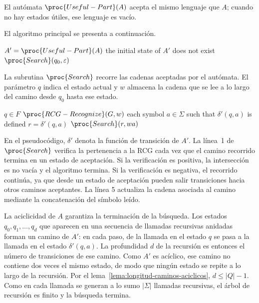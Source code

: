 \documentclass{report}
\theoremstyle{definition}
\theoremstyle{plain}
\theoremstyle{remark}
\begin{document}
El autómata $\proc{Useful-Part}(A)$ acepta el mismo lenguaje que $A$;
cuando no hay estados útiles, ese lenguaje es vacío.

El algoritmo principal se presenta a continuación.

\begin{codebox}
\li $A' = \proc{Useful-Part}(A)$
\li \If the initial state of $A'$ does not exist
\li \Then \Return {}
    \End
\li \Return $\proc{Search}(q_0,\varepsilon)$
\end{codebox}

La subrutina $\proc{Search}$ recorre las cadenas aceptadas por el
autómata. El parámetro $q$ indica el estado actual y $w$ almacena la
cadena que se lee a lo largo del camino desde $q_0$ hasta ese estado.

\begin{codebox}
\li \If $q \in F$  $\proc{RCG-Recognize}(G,w)$
\li \Then \Return {}
    \End
\li \For each symbol $a \in \Sigma$ such that $\delta'(q,a)$ is defined
\li \Do
        $r = \delta'(q,a)$
\li     \If $\proc{Search}(r,wa)$
\li     \Then \Return {}
        \End
    \End
\li \Return {}
\end{codebox}

En el pseudocódigo, $\delta'$ denota la función de transición de $A'$.
La línea~1 de $\proc{Search}$ verifica la pertenencia a la RCG cada vez
que el camino recorrido termina en un estado de aceptación. Si la
verificación
es positiva, la intersección es no vacía y el algoritmo termina. Si la
verificación es negativa, el recorrido continúa, ya que desde un estado
de aceptación pueden salir transiciones hacia otros caminos aceptantes.
La línea
5 actualiza la cadena asociada al camino mediante la concatenación del
símbolo leído.

La aciclicidad de $A$ garantiza la terminación de la búsqueda. Los
estados $q_0,q_1,\ldots,q_d$ que aparecen en una secuencia de llamadas
recursivas anidadas forman un camino de $A'$: en cada paso, de la
llamada en el estado $q$ se pasa a la llamada en el estado
$\delta'(q,a)$. La profundidad $d$ de la recursión es entonces el número
de transiciones de ese camino. Como $A'$ es acíclico, ese camino no
contiene dos veces el mismo estado, de modo que ningún estado se repite
a lo largo de la recursión. Por el
lema~\ref{lema:longitud-caminos-aciclicos}, $d \le |Q|-1$. Como en cada
llamada se generan a lo sumo $|\Sigma|$ llamadas recursivas, el árbol de
recursión es finito y la búsqueda termina.
\end{document}
